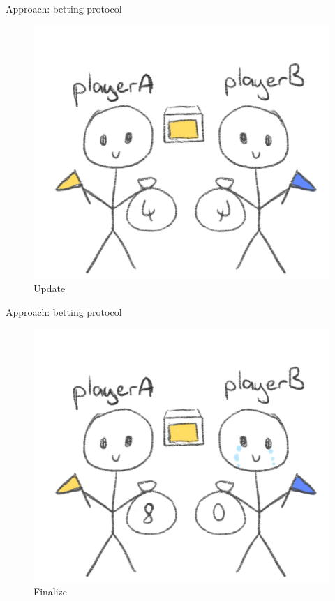 \documentclass[aspectratio=169]{beamer}
\begin{document}
  \begin{frame}{Approach: betting protocol}
    \begin{figure}
      \centering\includegraphics[scale=0.15]{img/2}
      \caption{Update}
    \end{figure}
  \end{frame}
  \begin{frame}{Approach: betting protocol}
    \begin{figure}
      \centering\includegraphics[scale=0.15]{img/3}
      \caption{Finalize}
    \end{figure}
  \end{frame}
\end{document}
